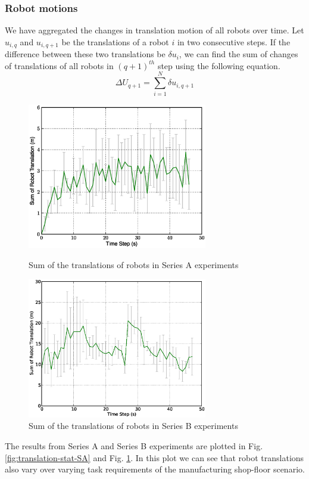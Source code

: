 \documentclass[smallcondensed]{svjour3}
\begin{document}
\subsubsection{Robot motions}
We have aggregated the changes in translation motion of all robots over time. Let $u_{i,q}$ and $u_{i,q+1}$ be the translations of a robot $i$ in two consecutive steps. If the difference between these two translations be $\delta u_{i}$, we can find the sum of changes of translations of all robots in $(q+1)^{th}$ step using the following equation.
\begin{equation}
\Delta U_{q+1} = \sum_{i=1}^{N} \delta u_{i, q+1} 
\label{eqn:Delta-Tr}
\end{equation}
\begin{figure}
\centering
\includegraphics[width=0.7\textwidth]{./8robots-DeltaTranslationStat.eps}
\caption{\small Sum of the translations of robots in Series A experiments}
\label{fig:translation-stat-SA} %
\centering
\includegraphics[width=0.7\textwidth]{./DeltaTranslationStat.eps}
\caption{\small Sum of the translations of robots in Series B experiments}
\label{fig:translation-stat-SB} %
\end{figure}
The results from Series A and Series B experiments are plotted in Fig. \ref{fig:translation-stat-SA} and Fig. \ref{fig:translation-stat-SB}. In this plot we can see that robot translations also vary over varying task requirements of the manufacturing shop-floor scenario.
\end{document}
